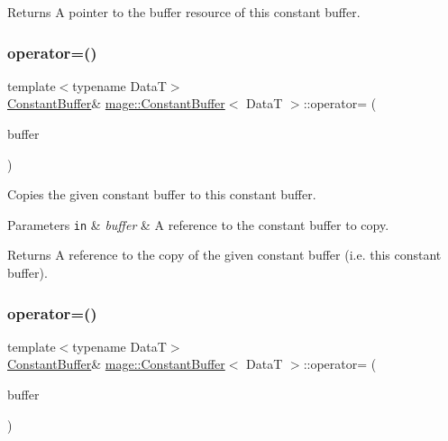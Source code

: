 \begin{DoxyReturn}{Returns}
A pointer to the buffer resource of this constant buffer. 
\end{DoxyReturn}
\hypertarget{classmage_1_1_constant_buffer_acb1a4f4b656073609075b5e89dea6973}{}\label{classmage_1_1_constant_buffer_acb1a4f4b656073609075b5e89dea6973} 
\subsubsection{\texorpdfstring{operator=()}{operator=()}\hspace{0.1cm}{\footnotesize\ttfamily [1/2]}}
{\footnotesize\ttfamily template$<$typename DataT$>$ \\
\hyperlink{classmage_1_1_constant_buffer}{Constant\+Buffer}\& \hyperlink{classmage_1_1_constant_buffer}{mage\+::\+Constant\+Buffer}$<$ DataT $>$\+::operator= (\begin{DoxyParamCaption}\item[{const \hyperlink{classmage_1_1_constant_buffer}{Constant\+Buffer}$<$ DataT $>$ \&}]{buffer }\end{DoxyParamCaption})\hspace{0.3cm}{\ttfamily [delete]}}

Copies the given constant buffer to this constant buffer.


\begin{DoxyParams}[1]{Parameters}
\mbox{\tt in}  & {\em buffer} & A reference to the constant buffer to copy. \\
\hline
\end{DoxyParams}
\begin{DoxyReturn}{Returns}
A reference to the copy of the given constant buffer (i.\+e. this constant buffer). 
\end{DoxyReturn}
\hypertarget{classmage_1_1_constant_buffer_ad050b1f0f03a5fcd2b51977a744781a3}{}\label{classmage_1_1_constant_buffer_ad050b1f0f03a5fcd2b51977a744781a3} 
\subsubsection{\texorpdfstring{operator=()}{operator=()}\hspace{0.1cm}{\footnotesize\ttfamily [2/2]}}
{\footnotesize\ttfamily template$<$typename DataT$>$ \\
\hyperlink{classmage_1_1_constant_buffer}{Constant\+Buffer}\& \hyperlink{classmage_1_1_constant_buffer}{mage\+::\+Constant\+Buffer}$<$ DataT $>$\+::operator= (\begin{DoxyParamCaption}\item[{\hyperlink{classmage_1_1_constant_buffer}{Constant\+Buffer}$<$ DataT $>$ \&\&}]{buffer }\end{DoxyParamCaption})\hspace{0.3cm}{\ttfamily [delete]}}

